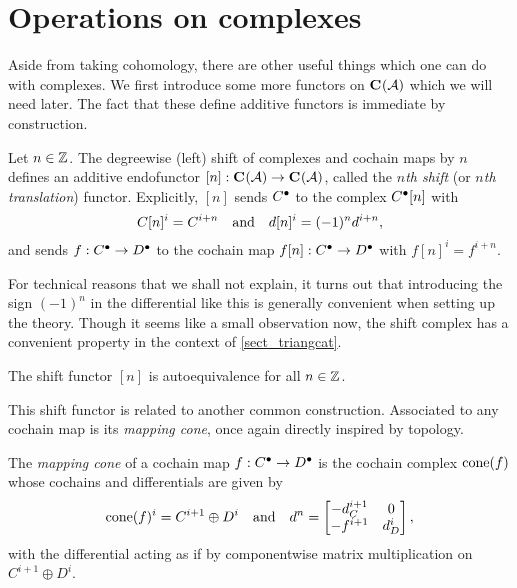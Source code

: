 \section{Operations on complexes}

Aside from taking cohomology, there are other useful things which one
can do with complexes.
We first introduce some more functors on ${\mathbf{C}}^{{}}({\mathcal{A}})$ which we
will need later.
The fact that these define additive functors is immediate by construction.

\begin{definition}
  Let $n \in \mathbb{Z}$.
  The degreewise (left) shift of complexes and cochain maps by $n$
  defines an additive endofunctor $[n]: {\mathbf{C}}^{{}}({\mathcal{A}}) \to
  {\mathbf{C}}^{{}}({\mathcal{A}})$, called the \emph{$n$th shift} (or \emph{$n$th
  translation}) functor.
  Explicitly, $[n]$ sends ${{C}}^{\bullet}$ to the complex
  ${{C}}^{\bullet}[n]$ with
  \[
    {C}[n]^i = C^{i + n}
    \quad \text{and} \quad
    d[n]^i = (-1)^n d^{i + n},
  \]
  and sends $f: {{C}}^{\bullet} \to {{D}}^{\bullet}$ to the cochain
  map $f[n]: {{C}}^{\bullet} \to {{D}}^{\bullet}$ with $f[n]^i = f^{i + n}$.
\end{definition}

For technical reasons that we shall not explain, it turns out that
introducing the sign $(-1)^n$ in the differential like this is
generally convenient when setting up the theory.
Though it seems like a small observation now, the shift complex has a
convenient property in the context of \cref{sect_triangcat}.

\begin{proposition}
  The shift functor $[n]$ is autoequivalence for all $n \in \mathbb{Z}$.
\end{proposition}

This shift functor is related to another common construction.
Associated to any cochain map is its \emph{mapping cone}, once again
directly inspired by topology.

\begin{definition}
  The \emph{mapping cone} of a cochain map $f: {{C}}^{\bullet} \to
  {{D}}^{\bullet}$ is the cochain complex $\operatorname{cone}({f})$ whose cochains
  and differentials are given by
  \[
    \operatorname{cone}({f})^i = C^{i + 1} \oplus D^i
    \quad \text{and} \quad
    d^n =
    \begin{bmatrix}
      -d_C^{i + 1} & 0 \\
      -f^{i + 1} & d^i_D
    \end{bmatrix},
  \]
  with the differential acting as if by componentwise matrix
  multiplication on $C^{i + 1} \oplus D^i$.
\end{definition}

